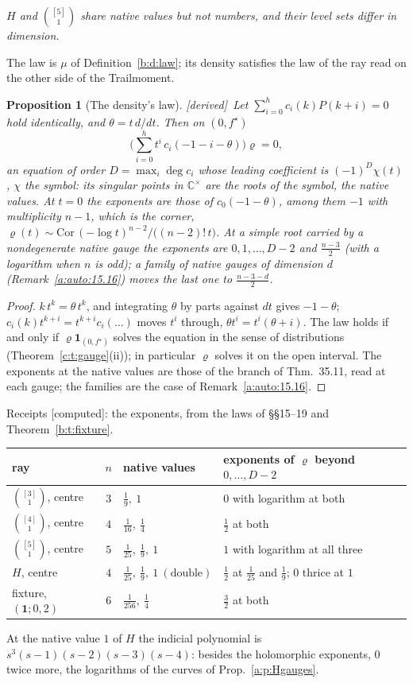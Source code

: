 \documentclass[11pt]{article}
\newcommand{\one}{\mathbf 1}
\theoremstyle{plain}
\newtheorem{proposition}{Proposition}[section]
\theoremstyle{definition}
\theoremstyle{remark}
\newcommand{\derived}{\textup{[derived]}}
\newcommand{\computed}{\textup{[computed]}}
\begin{document}
\emph{$H$ and $\binom{[5]}1$ share native values but not numbers, and their level sets differ in dimension.}

The law is $\mu$ of Definition~\ref{b:d:law}; its density satisfies the law of the ray read on the other side of the Trailmoment.

\begin{proposition}[The density's law]\label{b:p:density}\derived\
Let $\sum_{i=0}^hc_i(k)P(k+i)=0$ hold identically, and $\theta=t\,d/dt$. Then on $(0,f^\star)$
\[
\Big(\sum_{i=0}^ht^i\,c_i(-1-i-\theta)\Big)\varrho=0,
\]
an equation of order $D=\max_i\deg c_i$ whose leading coefficient is $(-1)^D\chi(t)$, $\chi$ the symbol: its singular points in $\mathbb C^\times$ are the roots of the symbol, the native values. At $t=0$ the exponents are those of $c_0(-1-\theta)$, among them $-1$ with multiplicity $n-1$, which is the corner, $\varrho(t)\sim\mathrm{Cor}\,(-\log t)^{n-2}/\big((n-2)!\,t\big)$. At a simple root carried by a nondegenerate native gauge the exponents are $0,1,\dots,D-2$ and $\frac{n-3}2$ (with a logarithm when $n$ is odd); a family of native gauges of dimension $d$ (Remark~\ref{a:auto:15.16}) moves the last one to $\frac{n-3-d}2$.
\end{proposition}

\begin{proof}
$k\,t^k=\theta\,t^k$, and integrating $\theta$ by parts against $dt$ gives $-1-\theta$; $c_i(k)t^{k+i}=t^{k+i}c_i(\ldots)$ moves $t^i$ through, $\theta t^i=t^i(\theta+i)$. The law holds if and only if $\varrho\one_{(0,f^\star)}$ solves the equation in the sense of distributions (Theorem~\ref{c:t:gauge}(ii)); in particular $\varrho$ solves it on the open interval. The exponents at the native values are those of the branch of Thm.~35.11, read at each gauge; the families are the case of Remark~\ref{a:auto:15.16}.
\end{proof}

\noindent Receipts \computed: the exponents, from the laws of \S\S15--19 and Theorem~\ref{b:t:fixture}.
\begin{center}
\small
\begin{tabular}{@{}l c l l@{}}
\toprule
ray & $n$ & native values & exponents of $\varrho$ beyond $0,\dots,D-2$\\ \midrule
$\binom{[3]}1$, centre & $3$ & $\frac19,\ 1$ & $0$ with logarithm at both\\
$\binom{[4]}1$, centre & $4$ & $\frac1{16},\ \frac14$ & $\frac12$ at both\\
$\binom{[5]}1$, centre & $5$ & $\frac1{25},\ \frac19,\ 1$ & $1$ with logarithm at all three\\
$H$, centre & $4$ & $\frac1{25},\ \frac19,\ 1\ (\text{double})$ & $\frac12$ at $\frac1{25}$ and $\frac19$; $0$ thrice at $1$\\
fixture, $(\one;0,2)$ & $6$ & $\frac1{256},\ \frac14$ & $\frac32$ at both\\
\bottomrule
\end{tabular}
\end{center}
At the native value $1$ of $H$ the indicial polynomial is $s^3(s-1)(s-2)(s-3)(s-4)$: besides the holomorphic exponents, $0$ twice more, the logarithms of the curves of Prop.~\ref{a:p:Hgauges}.
\end{document}

